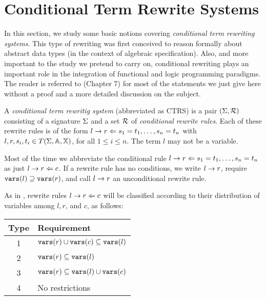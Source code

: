 \section{Conditional Term Rewrite Systems}
In this section, we study some basic notions covering \textit{conditional term rewriting systems}. This type of rewriting was first conceived to reason formally about abstract data types (in the context of algebraic specification). Also, and more important to the study we pretend to carry on, conditional rewriting plays an important role in the integration of functional and logic programming paradigms. The reader is referred to \cite{Ohlebusch:2010:ATT:1965591} (Chapter 7) for most of the statements we just give here without a proof and a more detailed discussion on the subject.

\begin{definition}
    A \textit{conditional term rewritig system} (abbreviated as CTRS) is a pair $(\Sigma, \mathcal{R})$ consisting of a signature $\Sigma$ and a set $\mathcal{R}$ of \textit{conditional rewrite rules}. Each of these rewrite rules is of the form $l \rightarrow r \Leftarrow s_1 = t_1, \dots, s_n = t_n$ with $l, r, s_i, t_i \in T(\Sigma,\mathbb{A},\mathbb{X})$, for all $1 \leq i \leq n$. The term $l$ may not be a variable.
\end{definition}

Most of the time we abbreviate the conditional rule $l \rightarrow r \Leftarrow s_1 = t_1, \dots, s_n = t_n$ as just $l \rightarrow r \Leftarrow c$. If a rewrite rule has no conditions, we write $l \rightarrow r$, require $\mathtt{vars}(l) \supseteq \mathtt{vars}(r)$, and call $l \rightarrow r$ an unconditional rewrite rule.

As in \cite{Middeldorp1994}, rewrite rules $l \rightarrow r \Leftarrow c$ will be classified according to their distribution of variables among $l, r$, and $c$, as follows:

\begin{table}[h!]
    \centering
    \begin{tabular}{c | l }
    \cline{1-2}
        Type & Requirement \\
    \hline
    1 & $\mathtt{vars}(r) \cup \mathtt{vars}(c) \subseteq \mathtt{vars}(l)$\\
    2 & $\mathtt{vars}(r) \subseteq  \mathtt{vars}(l)$ \\
    3 & $\mathtt{vars}(r) \subseteq \mathtt{vars}(l) \cup \mathtt{vars}(c)$ \\
    4 & No restrictions
    \end{tabular}
\end{table}

